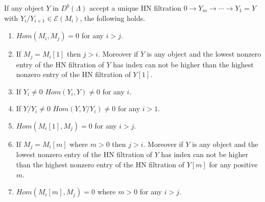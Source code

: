 \begin{lemma}\label{lem:C3L2}
If any object $Y$ in $D^b(\Lambda)$ accept a unique HN filtration $0\to Y_m\to\cdots\to Y_1=Y$ with $Y_i/Y_{i+1}\in \mathcal{E}(M_i)$, the following holds.
\begin{enumerate}
\item $Hom(M_i,M_j) = 0$ for any $i>j$.
\item If $M_j = M_i[1]$ then $j>i$. Moreover if $Y$ is any object and the lowest nonzero entry of the HN filtration of $Y$ has index can not be higher than the highest nonzero entry of the HN filtration of $Y[1]$. 
\item If $Y_i\neq 0$ $Hom(Y_i, Y)\neq 0$ for any $i$.
\item If $Y/Y_i\neq 0$ $Hom(Y, Y/Y_i)\neq 0$ for any $i>1$.
\item $Hom(M_i[1],M_j) = 0$ for any $i>j$.
\item If $M_j = M_i[m]$ where $m>0$ then $j>i$. Moreover if $Y$ is any object and the lowest nonzero entry of the HN filtration of $Y$ has index can not be higher than the highest nonzero entry of the HN filtration of $Y[m]$ for any positive $m$. 
\item $Hom(M_i[m],M_j) = 0$ where $m>0$ for any $i>j$.
\end{enumerate}
\end{lemma}
